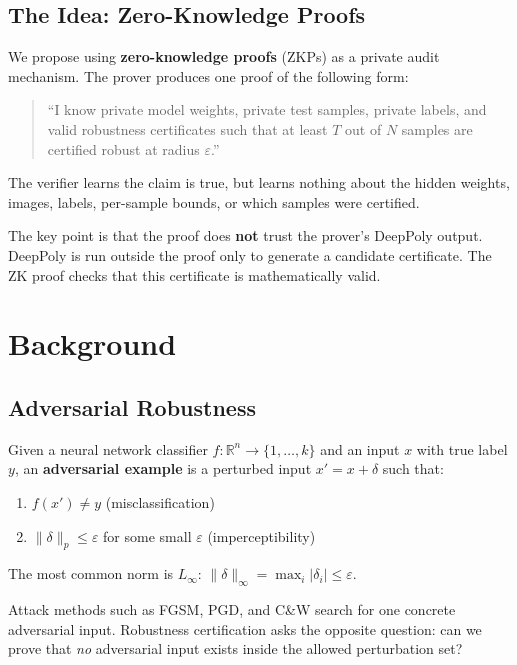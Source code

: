 \documentclass[11pt,a4paper]{article}
\begin{document}
\subsection{The Idea: Zero-Knowledge Proofs}

We propose using \textbf{zero-knowledge proofs} (ZKPs) as a private audit mechanism. The prover produces one proof of the following form:

\begin{quote}
``I know private model weights, private test samples, private labels, and valid robustness certificates such that at least $T$ out of $N$ samples are certified robust at radius $\varepsilon$.''
\end{quote}

The verifier learns the claim is true, but learns nothing about the hidden weights, images, labels, per-sample bounds, or which samples were certified.

The key point is that the proof does \textbf{not} trust the prover's DeepPoly output. DeepPoly is run outside the proof only to generate a candidate certificate. The ZK proof checks that this certificate is mathematically valid.

\section{Background}

\subsection{Adversarial Robustness}

Given a neural network classifier $f: \mathbb{R}^n \rightarrow \{1, \ldots, k\}$ and an input $x$ with true label $y$, an \textbf{adversarial example} is a perturbed input $x' = x + \delta$ such that:
\begin{enumerate}
    \item $f(x') \neq y$ (misclassification)
    \item $\|\delta\|_p \leq \varepsilon$ for some small $\varepsilon$ (imperceptibility)
\end{enumerate}

The most common norm is $L_\infty$: $\|\delta\|_\infty = \max_i |\delta_i| \leq \varepsilon$.

Attack methods such as FGSM, PGD, and C\&W search for one concrete adversarial input. Robustness certification asks the opposite question: can we prove that \textit{no} adversarial input exists inside the allowed perturbation set?
\end{document}
